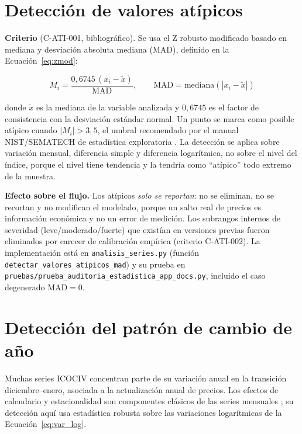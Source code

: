 \documentclass[12pt]{article}
\begin{document}
\section{Detecci\'on de valores at\'ipicos}
\label{sec:atipicos}

\textbf{Criterio} (C-ATI-001, bibliogr\'afico). Se usa el Z robusto modificado basado en mediana y desviaci\'on absoluta mediana (MAD), definido en la Ecuaci\'on~\ref{eq:zmod}:

\begin{equation}
M_i = \frac{0{,}6745\,(x_i - \tilde{x})}{\mathrm{MAD}}, \qquad \mathrm{MAD} = \mathrm{mediana}\left(|x_i - \tilde{x}|\right)
\label{eq:zmod}
\end{equation}

donde $\tilde{x}$ es la mediana de la variable analizada y $0{,}6745$ es el factor de consistencia con la desviaci\'on est\'andar normal. Un punto se marca como posible at\'ipico cuando $|M_i| > 3{,}5$, el umbral recomendado por el manual NIST/SEMATECH de estad\'istica exploratoria \citep{nist_outliers}. La detecci\'on se aplica sobre variaci\'on mensual, diferencia simple y diferencia logar\'itmica, no sobre el nivel del \'indice, porque el nivel tiene tendencia y la tendr\'ia como ``at\'ipico'' todo extremo de la muestra.

\textbf{Efecto sobre el flujo.} Los at\'ipicos \emph{solo se reportan}: no se eliminan, no se recortan y no modifican el modelado, porque un salto real de precios es informaci\'on econ\'omica y no un error de medici\'on. Los subrangos internos de severidad (leve/moderado/fuerte) que exist\'ian en versiones previas fueron eliminados por carecer de calibraci\'on emp\'irica (criterio C-ATI-002). La implementaci\'on est\'a en \texttt{analisis\_series.py} (funci\'on \texttt{detectar\_valores\_atipicos\_mad}) y su prueba en \texttt{pruebas/prueba\_auditoria\_estadistica\_app\_docs.py}, incluido el caso degenerado $\mathrm{MAD}=0$.

\section{Detecci\'on del patr\'on de cambio de a\~no}
\label{sec:calendario}

Muchas series ICOCIV concentran parte de su variaci\'on anual en la transici\'on diciembre--enero, asociada a la actualizaci\'on anual de precios. Los efectos de calendario y estacionalidad son componentes cl\'asicos de las series mensuales \citep{hyndman2021fpp3}; su detecci\'on aqu\'i usa estad\'istica robusta sobre las variaciones logar\'itmicas de la Ecuaci\'on~\ref{eq:var_log}.
\end{document}
